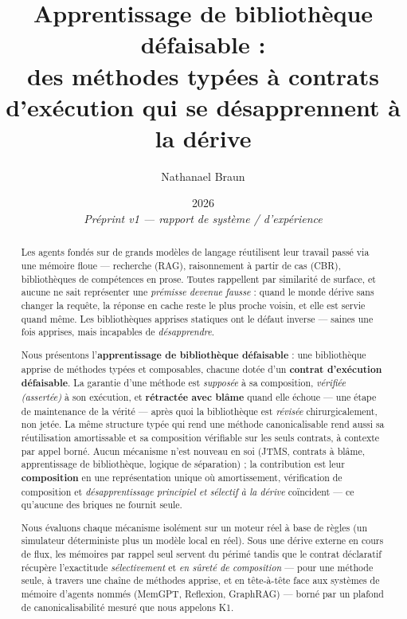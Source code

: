 \documentclass[11pt]{article}
\title{\textbf{Apprentissage de bibliothèque défaisable :\\ des méthodes typées à contrats d'exécution qui se désapprennent à la dérive}}
\author{Nathanael Braun}
\date{2026 \\[2pt] {\normalsize\itshape Préprint v1 --- rapport de système / d'expérience}}
\newcommand{\K}{\textsf{K1}}
\begin{document}
\maketitle

\begin{abstract}
Les agents fondés sur de grands modèles de langage réutilisent leur travail passé via une mémoire floue ---
recherche (RAG), raisonnement à partir de cas (CBR), bibliothèques de compétences en prose. Toutes rappellent par
similarité de surface, et aucune ne sait représenter une \emph{prémisse devenue fausse} : quand le monde dérive sans
changer la requête, la réponse en cache reste le plus proche voisin, et elle est servie quand même. Les
bibliothèques apprises statiques ont le défaut inverse --- saines une fois apprises, mais incapables de
\emph{désapprendre}.

Nous présentons l'\textbf{apprentissage de bibliothèque défaisable} : une bibliothèque apprise de méthodes typées
et composables, chacune dotée d'un \textbf{contrat d'exécution défaisable}. La garantie d'une méthode est
\emph{supposée} à sa composition, \emph{vérifiée (assertée)} à son exécution, et \textbf{rétractée avec blâme}
quand elle échoue --- une étape de maintenance de la vérité --- après quoi la bibliothèque est \emph{révisée}
chirurgicalement, non jetée. La même structure typée qui rend une méthode canonicalisable rend aussi sa
réutilisation amortissable et sa composition vérifiable sur les seuls contrats, à contexte par appel borné. Aucun
mécanisme n'est nouveau en soi (JTMS, contrats à blâme, apprentissage de bibliothèque, logique de séparation) ; la
contribution est leur \textbf{composition} en une représentation unique où amortissement, vérification de
composition et \emph{désapprentissage principiel et sélectif à la dérive} coïncident --- ce qu'aucune des briques ne
fournit seule.

Nous évaluons chaque mécanisme isolément sur un moteur réel à base de règles (un simulateur déterministe plus un
modèle local en réel). Sous une dérive externe en cours de flux, les mémoires par rappel seul servent du périmé
tandis que le contrat déclaratif récupère l'exactitude \emph{sélectivement} et \emph{en sûreté de composition} ---
pour une méthode seule, à travers une chaîne de méthodes apprise, et en tête-à-tête face aux systèmes de mémoire
d'agents nommés (MemGPT, Reflexion, GraphRAG) --- borné par un plafond de canonicalisabilité mesuré que nous
appelons \K{}.
\end{abstract}
\end{document}
